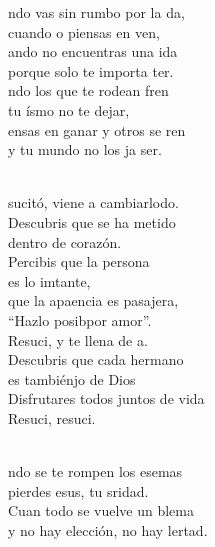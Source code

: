 \begin{cancion}%
	ndo vas sin rumbo por la da,\\
	cuando o piensas en ven,\\
	ando no encuentras una ida\\
	porque solo te importa ter.\\
	ndo los que te rodean fren\\
	tu ísmo no te dejar,\\
	ensas en ganar y otros se ren\\
	y tu mundo no los ja ser.\\\jump\\
	\begin{chorus}%
	sucitó, viene a cambiarlodo.\\
	Descubris que se ha metido  \\
	dentro de corazón.\\
	Percibis que la persona  \\
	es lo imtante,\\
	que la apaencia es pasajera,\\
	“Hazlo posibpor amor”.\\
	Resuci, y te llena de a. \\
	Descubris que cada hermano  \\
	es tambiénjo de Dios\\
	Disfrutares todos juntos de vida\\
	Resuci, resuci. \\
	\end{chorus}%
	\jump\\
	ndo se te rompen los esemas\\
	pierdes esus, tu sridad.\\
	Cuan todo se vuelve un blema\\
	y no hay elección, no hay lertad.\\

\end{cancion}
